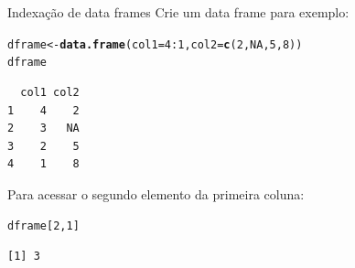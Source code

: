 \documentclass[10pt,handout]{beamer}\usepackage[]{graphicx}\usepackage[]{color}
\makeatletter
\newcommand{\hlnum}[1]{\textcolor[rgb]{0.686,0.059,0.569}{#1}}%
\newcommand{\hlopt}[1]{\textcolor[rgb]{0,0,0}{#1}}%
\newcommand{\hlstd}[1]{\textcolor[rgb]{0.345,0.345,0.345}{#1}}%
\newcommand{\hlkwb}[1]{\textcolor[rgb]{0.69,0.353,0.396}{#1}}%
\newcommand{\hlkwc}[1]{\textcolor[rgb]{0.333,0.667,0.333}{#1}}%
\newcommand{\hlkwd}[1]{\textcolor[rgb]{0.737,0.353,0.396}{\textbf{#1}}}%
\newenvironment{kframe}{%
 \def\at@end@of@kframe{}%
 \ifinner\ifhmode%
  \def\at@end@of@kframe{\end{minipage}}%
  \begin{minipage}{\columnwidth}%
 \fi\fi%
 \def\FrameCommand##1{\hskip\@totalleftmargin \hskip-\fboxsep
 \colorbox{shadecolor}{##1}\hskip-\fboxsep
     \hskip-\linewidth \hskip-\@totalleftmargin \hskip\columnwidth}%
 \MakeFramed {\advance\hsize-\width
   \@totalleftmargin\z@ \linewidth\hsize
   \@setminipage}}%
 {\par\unskip\endMakeFramed%
 \at@end@of@kframe}
\newenvironment{knitrout}{}{} %
\makeatother
\begin{document}
\begin{frame}[fragile]{Indexação de data frames}
Crie um data frame para exemplo:
\begin{knitrout}\small
{}\color{fgcolor}\begin{kframe}
\begin{alltt}
\hlstd{dframe} \hlkwb{<-} \hlkwd{data.frame}\hlstd{(}\hlkwc{col1} \hlstd{=} \hlnum{4}\hlopt{:}\hlnum{1}\hlstd{,} \hlkwc{col2} \hlstd{=} \hlkwd{c}\hlstd{(}\hlnum{2}\hlstd{,}\hlnum{NA}\hlstd{,}\hlnum{5}\hlstd{,}\hlnum{8}\hlstd{))}
\hlstd{dframe}
\end{alltt}
\begin{verbatim}
  col1 col2
1    4    2
2    3   NA
3    2    5
4    1    8
\end{verbatim}
\end{kframe}
\end{knitrout}
Para acessar o segundo elemento da primeira coluna:
\begin{knitrout}\small
{}\color{fgcolor}\begin{kframe}
\begin{alltt}
\hlstd{dframe[}\hlnum{2}\hlstd{,}\hlnum{1}\hlstd{]}
\end{alltt}
\begin{verbatim}
[1] 3
\end{verbatim}
\end{kframe}
\end{knitrout}
\end{frame}
\end{document}
